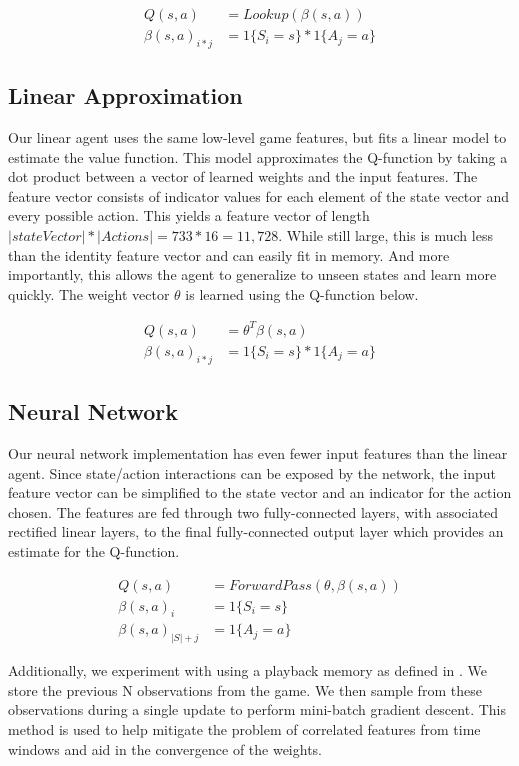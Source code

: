 \documentclass[12pt]{article}
\begin{document}
\begin{align*}
Q(s,a) &= Lookup(\beta(s,a))\\
\beta(s,a)_{i*j} &= 1\{ S_i = s \} * 1\{ A_j = a \}
\end{align*}

\subsection{Linear Approximation}

Our linear agent uses the same low-level game features, but fits a linear model to estimate the value function. This model approximates the Q-function by taking a dot product between a vector of learned weights and the input features. The feature vector consists of indicator values for each element of the state vector and every possible action. This yields a feature vector of length $|stateVector| * |Actions| = 733 * 16 = 11,728$. While still large, this is much less than the identity feature vector and can easily fit in memory. And more importantly, this allows the agent to generalize to unseen states and learn more quickly. The weight vector $\theta$ is learned using the Q-function below.

\begin{align*}
Q(s,a) &= \theta^T \beta(s,a)\\
\beta(s,a)_{i*j} &= 1\{ S_i = s \} * 1\{ A_j = a \}
\end{align*}

\subsection{Neural Network}

Our neural network implementation has even fewer input features than the linear agent. Since state/action interactions can be exposed by the network, the input feature vector can be simplified to the state vector and an indicator for the action chosen. The features are fed through two fully-connected layers, with associated rectified linear layers, to the final fully-connected output layer which provides an estimate for the Q-function.

\begin{align*}
Q(s,a) &= ForwardPass(\theta, \beta(s, a))\\
\beta(s,a)_{i} &= 1 \{ S_i = s \}\\
\beta(s,a)_{|S| + j} &= 1 \{ A_j = a \}
\end{align*}

Additionally, we experiment with using a playback memory as defined in \cite{mnih2013playing}. We store the previous N observations from the game. We then sample from these observations during a single update to perform mini-batch gradient descent. This method is used to help mitigate the problem of correlated features from time windows and aid in the convergence of the weights.
\end{document}
